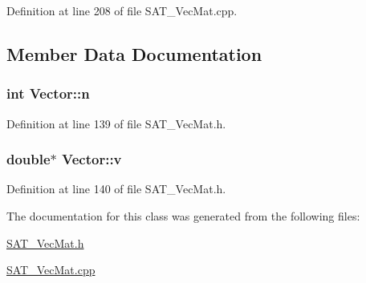 Definition at line 208 of file S\-A\-T\-\_\-\-Vec\-Mat.\-cpp.



\subsection{Member Data Documentation}
\hypertarget{classVector_ae98c07dd919f955878426f11a667cb17}{
\subsubsection[{n}]{\setlength{\rightskip}{0pt plus 5cm}int Vector\-::n\hspace{0.3cm}{\ttfamily [private]}}}\label{classVector_ae98c07dd919f955878426f11a667cb17}


Definition at line 139 of file S\-A\-T\-\_\-\-Vec\-Mat.\-h.

\hypertarget{classVector_a47bd493ed4108e07d835bee137edb26b}{
\subsubsection[{v}]{\setlength{\rightskip}{0pt plus 5cm}double$\ast$ Vector\-::v\hspace{0.3cm}{\ttfamily [private]}}}\label{classVector_a47bd493ed4108e07d835bee137edb26b}


Definition at line 140 of file S\-A\-T\-\_\-\-Vec\-Mat.\-h.



The documentation for this class was generated from the following files\-:\begin{DoxyCompactItemize}
\item 
\hyperlink{SAT__VecMat_8h}{S\-A\-T\-\_\-\-Vec\-Mat.\-h}\item 
\hyperlink{SAT__VecMat_8cpp}{S\-A\-T\-\_\-\-Vec\-Mat.\-cpp}\end{DoxyCompactItemize}
